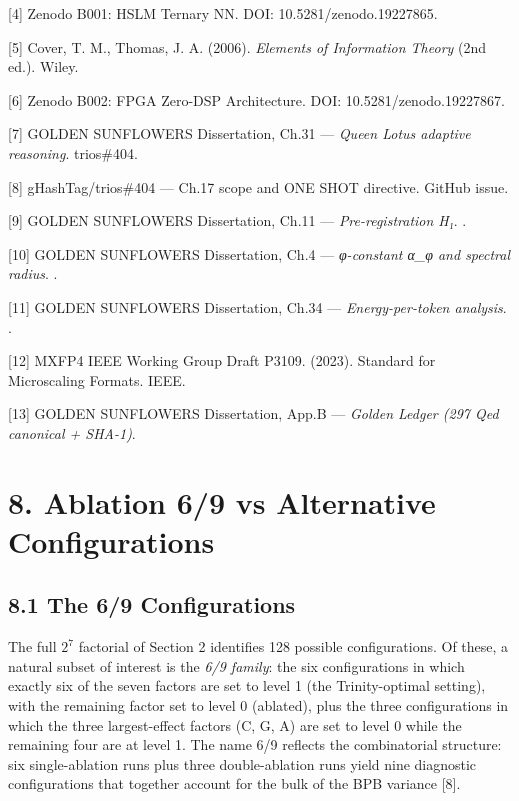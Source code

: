 [4] Zenodo B001: HSLM Ternary NN. DOI:
10.5281/zenodo.19227865.

[5] Cover, T. M., Thomas, J. A. (2006).
\emph{Elements of Information Theory} (2nd ed.).
Wiley.

[6] Zenodo B002: FPGA Zero-DSP Architecture.
DOI: 10.5281/zenodo.19227867.

[7] GOLDEN SUNFLOWERS Dissertation, Ch.31 ---
\emph{Queen Lotus adaptive reasoning}. trios\#404.

[8] gHashTag/trios\#404 --- Ch.17 scope and
ONE SHOT directive. GitHub issue.

[9] GOLDEN SUNFLOWERS Dissertation, Ch.11 ---
\emph{Pre-registration H₁}.
.

[10] GOLDEN SUNFLOWERS Dissertation, Ch.4 ---
\emph{φ-constant α\_φ and spectral radius}.
.

[11] GOLDEN SUNFLOWERS Dissertation, Ch.34 ---
\emph{Energy-per-token analysis}.
.

[12] MXFP4 IEEE Working Group Draft P3109.
(2023). Standard for Microscaling Formats. IEEE.

[13] GOLDEN SUNFLOWERS Dissertation, App.B ---
\emph{Golden Ledger (297 Qed canonical + SHA-1)}.

\section{8. Ablation 6/9 vs Alternative
Configurations}\label{fa_17:ablation-6-9}

\subsection{8.1 The 6/9
Configurations}\label{fa_17:the-69-configurations}

The full \(2^7\) factorial of Section 2 identifies
128 possible configurations.  Of these, a natural
subset of interest is the \emph{6/9 family}: the
six configurations in which exactly six of the
seven factors are set to level 1 (the
Trinity-optimal setting), with the remaining factor
set to level 0 (ablated), plus the three
configurations in which the three largest-effect
factors (C, G, A) are set to level 0 while the
remaining four are at level 1.  The name 6/9
reflects the combinatorial structure: six
single-ablation runs plus three double-ablation
runs yield nine diagnostic configurations that
together account for the bulk of the BPB
variance [8].

